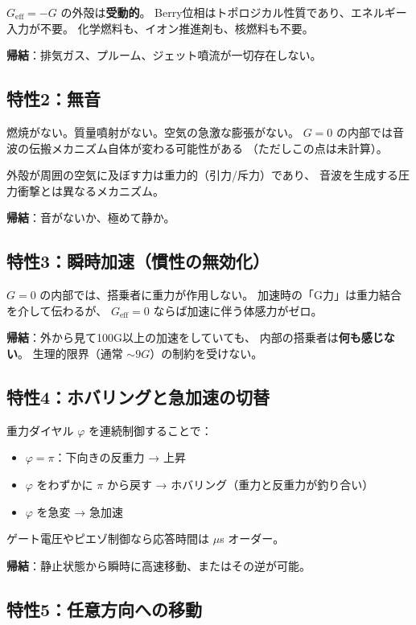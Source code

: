 \documentclass[11pt,a4paper]{article}
\begin{document}
$G_{\mathrm{eff}} = -G$ の外殻は\textbf{受動的}。
Berry位相はトポロジカル性質であり、エネルギー入力が不要。
化学燃料も、イオン推進剤も、核燃料も不要。

\textbf{帰結}：排気ガス、プルーム、ジェット噴流が一切存在しない。

\subsection{特性2：無音}

燃焼がない。質量噴射がない。空気の急激な膨張がない。
$G = 0$ の内部では音波の伝搬メカニズム自体が変わる可能性がある
（ただしこの点は未計算）。

外殻が周囲の空気に及ぼす力は重力的（引力/斥力）であり、
音波を生成する圧力衝撃とは異なるメカニズム。

\textbf{帰結}：音がないか、極めて静か。

\subsection{特性3：瞬時加速（慣性の無効化）}

$G = 0$ の内部では、搭乗者に重力が作用しない。
加速時の「G力」は重力結合を介して伝わるが、
$G_{\mathrm{eff}} = 0$ ならば加速に伴う体感力がゼロ。

\textbf{帰結}：外から見て100G以上の加速をしていても、
内部の搭乗者は\textbf{何も感じない}。
生理的限界（通常 $\sim 9G$）の制約を受けない。

\subsection{特性4：ホバリングと急加速の切替}

重力ダイヤル $\varphi$ を連続制御することで：
\begin{itemize}
\item $\varphi = \pi$：下向きの反重力 → 上昇
\item $\varphi$ をわずかに $\pi$ から戻す → ホバリング（重力と反重力が釣り合い）
\item $\varphi$ を急変 → 急加速
\end{itemize}

ゲート電圧やピエゾ制御なら応答時間は $\mu$s オーダー。

\textbf{帰結}：静止状態から瞬時に高速移動、またはその逆が可能。

\subsection{特性5：任意方向への移動}
\end{document}
